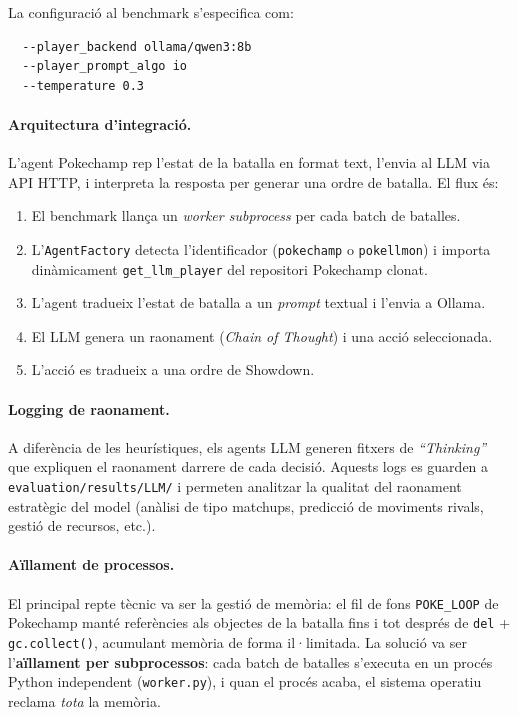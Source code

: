 La configuració al benchmark s'especifica com:
\begin{verbatim}
  --player_backend ollama/qwen3:8b
  --player_prompt_algo io
  --temperature 0.3
\end{verbatim}

\paragraph{Arquitectura d'integració.}
L'agent Pokechamp rep l'estat de la batalla en format text, l'envia al LLM via API HTTP, i interpreta la resposta per generar una ordre de batalla. El flux és:
\begin{enumerate}
    \item El benchmark llança un \textit{worker subprocess} per cada batch de batalles.
    \item L'\texttt{AgentFactory} detecta l'identificador (\texttt{pokechamp} o \texttt{pokellmon}) i importa dinàmicament \texttt{get\_llm\_player} del repositori Pokechamp clonat.
    \item L'agent tradueix l'estat de batalla a un \textit{prompt} textual i l'envia a Ollama.
    \item El LLM genera un raonament (\textit{Chain of Thought}) i una acció seleccionada.
    \item L'acció es tradueix a una ordre de Showdown.
\end{enumerate}

\paragraph{Logging de raonament.}
A diferència de les heurístiques, els agents LLM generen fitxers de \textit{``Thinking''} que expliquen el raonament darrere de cada decisió. Aquests logs es guarden a \texttt{evaluation/results/LLM/} i permeten analitzar la qualitat del raonament estratègic del model (anàlisi de tipo matchups, predicció de moviments rivals, gestió de recursos, etc.).

\paragraph{Aïllament de processos.}
El principal repte tècnic va ser la gestió de memòria: el fil de fons \texttt{POKE\_LOOP} de Pokechamp manté referències als objectes de la batalla fins i tot després de \texttt{del} + \texttt{gc.collect()}, acumulant memòria de forma il·limitada. La solució va ser l'\textbf{aïllament per subprocessos}: cada batch de batalles s'executa en un procés Python independent (\texttt{worker.py}), i quan el procés acaba, el sistema operatiu reclama \textit{tota} la memòria.


